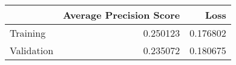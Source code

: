 \begin{tabular}{lrr}
\toprule
{} &  Average Precision Score &      Loss \\
\midrule
Training   &                 0.250123 &  0.176802 \\
Validation &                 0.235072 &  0.180675 \\
\bottomrule
\end{tabular}
